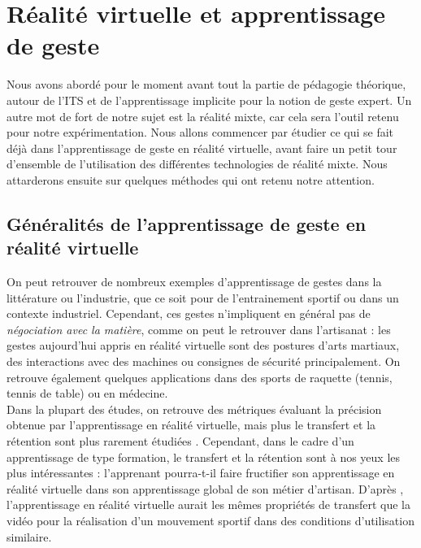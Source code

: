 \section{Réalité virtuelle et apprentissage de geste}

Nous avons abordé pour le moment avant tout la partie de pédagogie théorique, autour de l'ITS et de l'apprentissage implicite pour la notion de geste expert. 
Un autre mot de fort de notre sujet est la réalité mixte, car cela sera l'outil retenu pour notre expérimentation.
Nous allons commencer par étudier ce qui se fait déjà dans l'apprentissage de geste en réalité virtuelle, avant faire un petit tour d'ensemble de l'utilisation des différentes technologies de réalité mixte.
Nous attarderons ensuite sur quelques méthodes qui ont retenu notre attention. 

\subsection{Généralités de l'apprentissage de geste en réalité virtuelle}

On peut retrouver de nombreux exemples d'apprentissage de gestes dans la littérature ou l'industrie, que ce soit pour de l'entrainement sportif ou dans un contexte industriel.
Cependant, ces gestes n'impliquent en général pas de \textit{négociation avec la matière}, comme on peut le retrouver dans l'artisanat : 
les gestes aujourd'hui appris en réalité virtuelle sont des postures d'arts martiaux, des interactions avec des machines ou consignes de sécurité principalement. 
On retrouve également quelques applications dans des sports de raquette (tennis, tennis de table) ou en médecine. \\

Dans la plupart des études, on retrouve des métriques évaluant la précision obtenue par l'apprentissage en réalité virtuelle, mais plus le transfert et la rétention sont plus rarement étudiées \cite{ComplexSkillVRLearningReview.Levac+}.
Cependant, dans le cadre d'un apprentissage de type formation, le transfert et la rétention sont à nos yeux les plus intéressantes : l'apprenant pourra-t-il faire fructifier son apprentissage en réalité virtuelle dans son apprentissage global de son métier d'artisan. 
D'après \cite{TrainingVR.Pastel+}, l'apprentissage en réalité virtuelle aurait les mêmes propriétés de transfert que la vidéo pour la réalisation d'un mouvement sportif dans des conditions d'utilisation similaire.  \\

